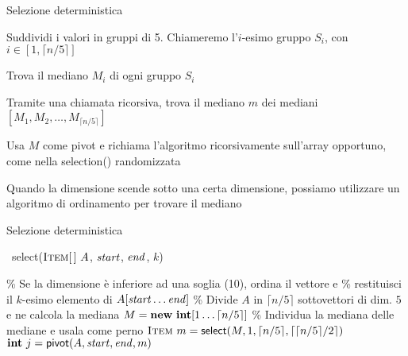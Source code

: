 \begin{frame}{Selezione deterministica}

\vspace{-9pt}
\begin{myboxtitle}[Idea]
\BIL
\item Suddividi i valori in gruppi di 5. Chiameremo l'$i$-esimo gruppo $S_i$, con $i \in \left[1, \lceil n/5 \rceil \right]$
\item Trova il mediano $M_i$ di ogni gruppo $S_i$
\item Tramite una chiamata ricorsiva, trova il mediano $m$ dei mediani
$[M_1, M_2, \ldots, M_{\lceil n/5 \rceil}]$
\item Usa $M$ come pivot e richiama l'algoritmo ricorsivamente sull'array opportuno, come nella \textsf{selection}() randomizzata
\item Quando la dimensione scende sotto una certa dimensione, possiamo
utilizzare un algoritmo di ordinamento per trovare il mediano
\EIL
\end{myboxtitle}

\end{frame}

\begin{frame}{Selezione deterministica}

\vspace{-12pt}
\small
\begin{Procedure}
\caption[A]{\Item\ \textsf{select}($\textsc{Item}[\,]\ A$, \INTEGER $\mathit{start}$, \INTEGER $\mathit{end}$, \INTEGER $k$)}
\% Se la dimensione è inferiore ad una soglia (10), ordina il vettore e\;
\% restituisci il $k$-esimo  elemento di $A[\mathit{start} \ldots \mathit{end}]$\;
\BlankLine
\% Divide $A$ in $\lceil n/5 \rceil$ sottovettori di dim. $5$ e ne calcola la mediana\;
$M = \NEW\ \INTEGER[1 \ldots \lceil n/5 \rceil]$\;
\BlankLine
\% Individua la mediana delle mediane e usala come perno\;
$\textsc{Item}\ m = \textsf{select}(M, 1, \lceil n/5 \rceil, \lceil \lceil n/5 \rceil/2 \rceil)$\;
$\INTEGER\ j = \textsf{pivot}(A, \Primo, \Ultimo, m)$\;
[...]\;
\end{Procedure}

\end{frame}

